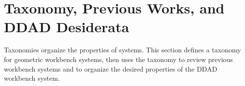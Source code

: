 \section{Taxonomy, Previous Works, and DDAD Desiderata}


Taxonomies organize the properties of systems. This section defines a taxonomy
for geometric workbench systems, then uses the taxonomy to review previous
workbench systems and to organize the desired properties of the DDAD workbench
system.

% 


